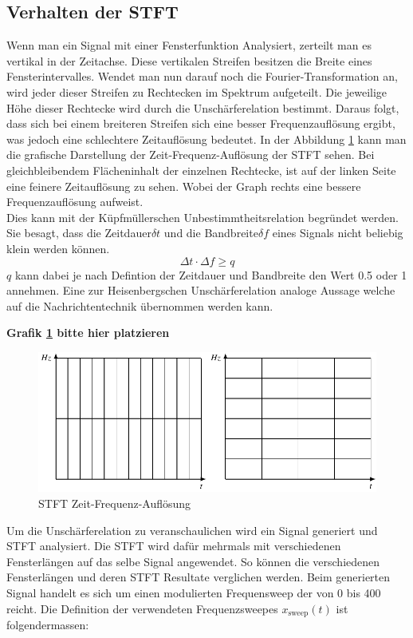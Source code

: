 \subsection{Verhalten der STFT}

Wenn man ein Signal mit einer Fensterfunktion Analysiert, zerteilt man es vertikal in der Zeitachse. Diese vertikalen Streifen besitzen die Breite eines Fensterintervalles. Wendet man nun darauf noch die Fourier-Transformation an, wird jeder dieser Streifen zu Rechtecken im Spektrum aufgeteilt. Die jeweilige Höhe dieser Rechtecke wird durch die Unschärferelation bestimmt. Daraus folgt, dass sich bei einem breiteren Streifen sich eine besser Frequenzauflösung ergibt, was jedoch eine schlechtere Zeitauflösung bedeutet. In der Abbildung \ref{fig:stftauf} kann man die grafische Darstellung der Zeit-Frequenz-Auflösung der STFT sehen. Bei gleichbleibendem Flächeninhalt der einzelnen Rechtecke, ist auf der linken Seite eine feinere Zeitauflösung zu sehen. Wobei der Graph rechts eine bessere Frequenzauflösung aufweist. \\

Dies kann mit der Küpfmüllerschen Unbestimmtheitsrelation begründet werden. Sie besagt, dass die Zeitdauer$\delta t$ und die Bandbreite$\delta f$ eines Signals nicht beliebig klein werden können.  
\[\Delta t \cdot \Delta f \geq q\]
$q$ kann dabei je nach Defintion der Zeitdauer und Bandbreite den Wert 0.5 oder 1 annehmen. Eine zur Heisenbergschen Unschärferelation analoge Aussage welche auf die Nachrichtentechnik übernommen werden kann.

\color{red}\textbf{Grafik \ref{fig:stftauf} bitte hier platzieren} \color{black} %

\begin{figure}[h]
	\centering
	\includegraphics[width=0.7\linewidth]{papers/autotune/sections/fft/images/windows.pdf}
	\caption{STFT Zeit-Frequenz-Auflösung}\label{fig:stftauf}	
\end{figure}




Um die Unschärferelation zu veranschaulichen wird ein Signal generiert und STFT analysiert. Die STFT wird dafür mehrmals mit verschiedenen Fensterlängen auf das selbe Signal angewendet. So können die verschiedenen Fensterlängen und deren STFT Resultate verglichen werden. Beim generierten Signal handelt es sich um einen modulierten Frequensweep der von 0 bis 400\text{[Hz]} reicht. Die Definition der verwendeten Frequenzsweepes $x_{\text{sweep}}(t)$ ist folgendermassen:

